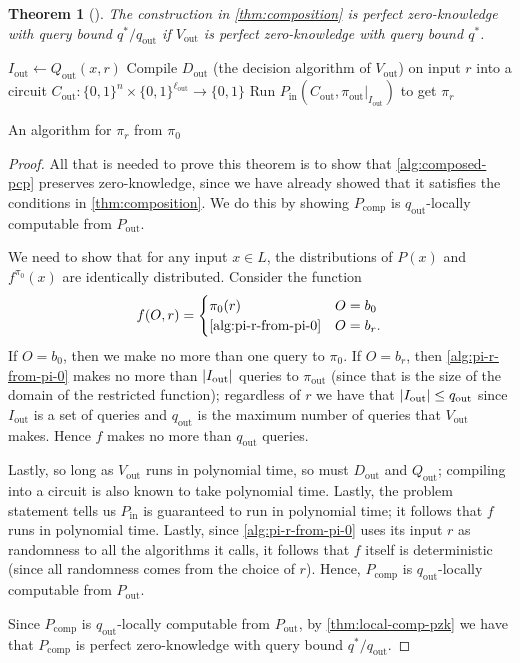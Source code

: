 \documentclass[english,12pt]{reedthesis}
\theoremstyle{plain}
\newtheorem{thm}{Theorem}[section]
\theoremstyle{definition}
\theoremstyle{remark}
\DeclareMathOperator{\comp}{comp}
\DeclareMathOperator{\out}{out}
\DeclareMathOperator{\oin}{in}
\DeclarePairedDelimiter{\abs}{\lvert}{\rvert}
\begin{document}
\begin{thm}[{\cite[Theorem 3.7]{GOS25}}]\label{thm:comp-pzk}
  The construction in \cref{thm:composition} is perfect zero-knowledge with
  query bound $q^{*}/q_{\out}$ if $V_{\out}$ is perfect zero-knowledge with
  query bound $q^{*}$.
\end{thm}

\begin{algorithm}[htbp]
  \KwIn{A string $r \in \{0, 1\}^{r_{\out}}$}
  $I_{\out} \leftarrow Q_{\out}(x, r)$\;
  Compile $D_{\out}$ (the decision algorithm of $V_{\out}$) on input $r$ into a
  circuit $C_{\out}\colon \{0, 1\}^{n} \times \{0, 1\}^{\ell_{\out}} \rightarrow \{0, 1\}$\;
  Run $P_{\oin}(C_{\out}, \pi_{\out}|_{I_{\out}})$ to get $\pi_{r}$\;
  \;
  \caption{An algorithm for $\pi_{r}$ from $\pi_{0}$}\label{alg:pi-r-from-pi-0}
\end{algorithm}

\begin{proof}
  All that is needed to prove this theorem is to show that
  \cref{alg:composed-pcp} preserves zero-knowledge, since we have already showed
  that it satisfies the conditions in \cref{thm:composition}. We do this by
  showing $P_{\comp}$ is $q_{\out}$-locally computable from $P_{\out}$.

  We need to show that for any input $x \in L$, the distributions of $P(x)$ and
  $f^{\pi_{0}}(x)$ are identically distributed. Consider the function
  \begin{equation}
    f(O, r) = \begin{cases}
      \pi_{0}(r) & O = b_{0} \\
      \text{\cref{alg:pi-r-from-pi-0}} & O = b_{r}.
    \end{cases}
  \end{equation}
  If $O = b_{0}$, then we make no more than one query to $\pi_{0}$. If
  $O = b_{r}$, then \cref{alg:pi-r-from-pi-0} makes no more than
  $\abs{I_{\out}}$ queries to $\pi_{\out}$ (since that is the size of the domain
  of the restricted function); regardless of $r$ we have that
  $\abs{I_{\out}} \le q_{\out}$ since $I_{\out}$ is a set of queries and
  $q_{\out}$ is the maximum number of queries that $V_{\out}$ makes. Hence $f$
  makes no more than $q_{\out}$ queries.

  Lastly, so long as $V_{\out}$ runs in polynomial time, so must $D_{\out}$ and
  $Q_{\out}$; compiling into a circuit is also known to take polynomial time.
  Lastly, the problem statement tells us $P_{\oin}$ is guaranteed to run in
  polynomial time; it follows that $f$ runs in polynomial time. Lastly, since
  \cref{alg:pi-r-from-pi-0} uses its input $r$ as randomness to all the
  algorithms it calls, it follows that $f$ itself is deterministic (since all
  randomness comes from the choice of $r$). Hence, $P_{\comp}$ is
  $q_{\out}$-locally computable from $P_{\out}$.

  Since $P_{\comp}$ is $q_{\out}$-locally computable from $P_{\out}$, by
  \cref{thm:local-comp-pzk} we have that $P_{\comp}$ is perfect zero-knowledge
  with query bound $q^{*}/q_{\out}$.
\end{proof}
\end{document}
